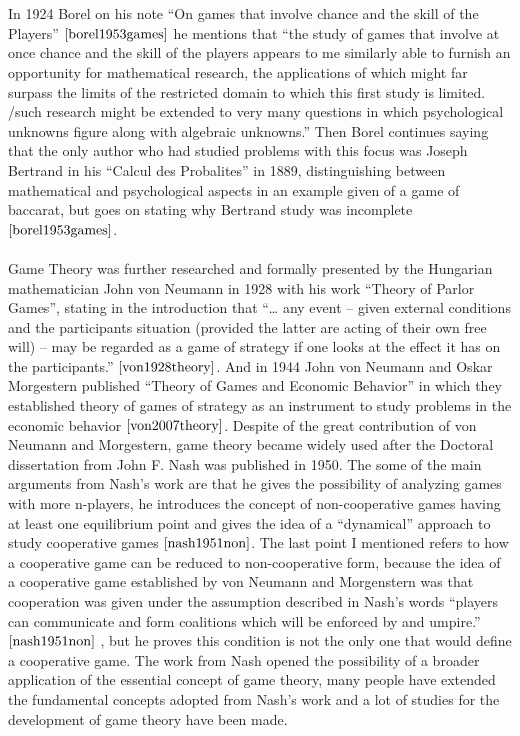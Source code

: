 \documentclass{book}
\begin{document}
\\\\ In 1924 Borel on his note ``On games that involve chance and the skill of the Players'' $\cite{borel1953games}$ he mentions that ``the study of games that involve at once chance and the skill of the players appears to me similarly able to furnish an opportunity for mathematical research, the applications of which might far surpass the limits of the restricted domain to which this first study is limited. /such research might be extended to very many questions in which psychological unknowns figure along with algebraic unknowns.'' Then Borel continues saying that the only author who had studied problems with this focus was Joseph Bertrand in his ``Calcul des Probalites'' in 1889, distinguishing between mathematical and psychological aspects in an example given of a game of baccarat, but goes on stating why Bertrand study was incomplete $\cite{borel1953games}$.
\\\\ Game Theory was further researched and formally presented by the Hungarian mathematician John von Neumann in 1928 with his work “Theory of Parlor Games”, stating in the introduction that ``… any event – given external conditions and the participants situation (provided the latter are acting of their own free will) – may be regarded as a game of strategy if one looks at the effect it has on the participants.” $\cite{von1928theory}$. And in 1944 John von Neumann and Oskar Morgestern published “Theory of Games and Economic Behavior” in which they established theory of games of strategy as an instrument to study problems in the economic behavior $\cite{von2007theory}$. 
Despite of the great contribution of von Neumann and Morgestern, game theory became widely used after the Doctoral dissertation from John F. Nash was published in 1950. The some of the main arguments from Nash’s work are that he gives the possibility of analyzing games with more n-players, he introduces the concept of non-cooperative games having at least one equilibrium point and gives the idea of a “dynamical” approach to study cooperative games $\cite{nash1951non}$. The last point I mentioned refers to how a cooperative game can be reduced to non-cooperative form, because the idea of a cooperative game established by von Neumann and Morgenstern was that cooperation was given under the assumption described in Nash’s words “players can communicate and form coalitions which will be enforced by and umpire.” $\cite{nash1951non}$ , but he proves this condition is not the only one that would define a cooperative game. The work from Nash opened the possibility of a broader application of the essential concept of game theory, many people have extended the fundamental concepts adopted from Nash’s work and a lot of studies for the development of game theory have been made.
\end{document}
